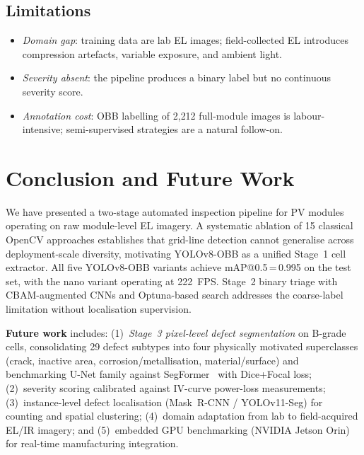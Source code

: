 \documentclass[conference]{IEEEtran}
\begin{document}
\subsection{Limitations}

\begin{itemize}
  \item \textit{Domain gap}: training data are lab EL images;
        field-collected EL introduces compression artefacts,
        variable exposure, and ambient light.
  \item \textit{Severity absent}: the pipeline produces a
        binary label but no continuous severity score.
  \item \textit{Annotation cost}: OBB labelling of 2{,}212
        full-module images is labour-intensive; semi-supervised
        strategies are a natural follow-on.
\end{itemize}

\section{Conclusion and Future Work}
\label{sec:conclusion}

We have presented a two-stage automated inspection pipeline
for PV modules operating on raw module-level EL imagery.
A systematic ablation of 15 classical OpenCV approaches
establishes that grid-line detection cannot generalise across
deployment-scale diversity, motivating YOLOv8-OBB as a unified
Stage~1 cell extractor.
All five YOLOv8-OBB variants achieve mAP@0.5\,=\,0.995
on the test set, with the nano variant operating at 222~FPS.
Stage~2 binary triage with CBAM-augmented CNNs and
Optuna-based search addresses the coarse-label limitation
without localisation supervision.

\textbf{Future work} includes:
(1)~\textit{Stage~3 pixel-level defect segmentation} on
B-grade cells, consolidating 29 defect subtypes into four
physically motivated superclasses (crack, inactive area,
corrosion/metallisation, material/surface) and benchmarking
U-Net family against SegFormer~\cite{xie2021} with
Dice+Focal loss;
(2)~severity scoring calibrated against IV-curve power-loss
measurements;
(3)~instance-level defect localisation (Mask~R-CNN /
YOLOv11-Seg) for counting and spatial clustering;
(4)~domain adaptation from lab to field-acquired EL/IR
imagery; and
(5)~embedded GPU benchmarking (NVIDIA Jetson Orin) for
real-time manufacturing integration.
\end{document}
